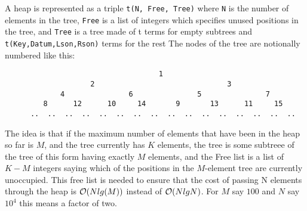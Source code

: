 A heap is represented as a triple {\tt t(N, Free, Tree)} where {\tt N}
is the number of elements in the tree, {\tt Free} is a list of
integers which specifies unused positions in the tree, and {\tt Tree}
is a tree made of t terms for empty subtrees and {\tt
  t(Key,Datum,Lson,Rson)} terms for the rest The nodes of the tree are
notionally numbered like this:
%
\begin{verbatim}
                                    1
                    2                               3
             4               6               5               7
         8      12      10     14       9       13      11     15
      ..  ..  ..  ..  ..  ..  ..  ..  ..  ..  ..  ..  ..  ..  ..  ..
\end{verbatim}

The idea is that if the maximum number of elements that have been in
the heap so far is $M$, and the tree currently has $K$ elements, the
tree is some subtreee of the tree of this form having exactly $M$
elements, and the Free list is a list of $K-M$ integers saying which
of the positions in the $M$-element tree are currently unoccupied.
This free list is needed to ensure that the cost of passing N elements
through the heap is ${\cal O}(Nlg(M))$ instead of ${\cal O} (NlgN)$.  For $M$ say
$100$ and $N$ say $10^4$ this means a factor of two.
%


